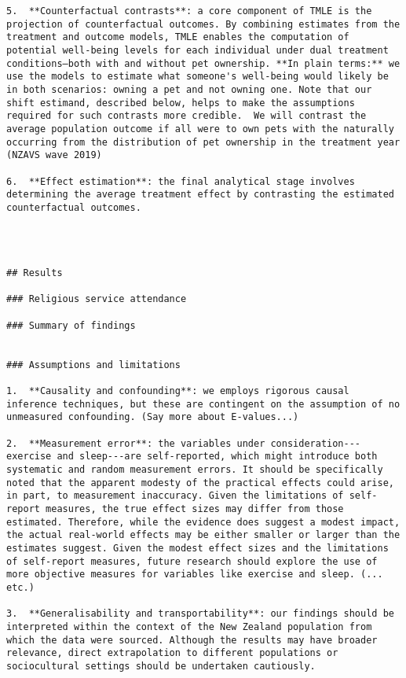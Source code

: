\documentclass[
  singlecolumn]{article}
\begin{document}
\begin{verbatim}
5.  **Counterfactual contrasts**: a core component of TMLE is the projection of counterfactual outcomes. By combining estimates from the treatment and outcome models, TMLE enables the computation of potential well-being levels for each individual under dual treatment conditions—both with and without pet ownership. **In plain terms:** we use the models to estimate what someone's well-being would likely be in both scenarios: owning a pet and not owning one. Note that our shift estimand, described below, helps to make the assumptions required for such contrasts more credible.  We will contrast the average population outcome if all were to own pets with the naturally occurring from the distribution of pet ownership in the treatment year (NZAVS wave 2019)

6.  **Effect estimation**: the final analytical stage involves determining the average treatment effect by contrasting the estimated counterfactual outcomes. 




## Results

### Religious service attendance

### Summary of findings


### Assumptions and limitations

1.  **Causality and confounding**: we employs rigorous causal inference techniques, but these are contingent on the assumption of no unmeasured confounding. (Say more about E-values...)

2.  **Measurement error**: the variables under consideration---exercise and sleep---are self-reported, which might introduce both systematic and random measurement errors. It should be specifically noted that the apparent modesty of the practical effects could arise, in part, to measurement inaccuracy. Given the limitations of self-report measures, the true effect sizes may differ from those estimated. Therefore, while the evidence does suggest a modest impact, the actual real-world effects may be either smaller or larger than the estimates suggest. Given the modest effect sizes and the limitations of self-report measures, future research should explore the use of more objective measures for variables like exercise and sleep. (... etc.)

3.  **Generalisability and transportability**: our findings should be interpreted within the context of the New Zealand population from which the data were sourced. Although the results may have broader relevance, direct extrapolation to different populations or sociocultural settings should be undertaken cautiously.


\end{verbatim}
\end{document}
